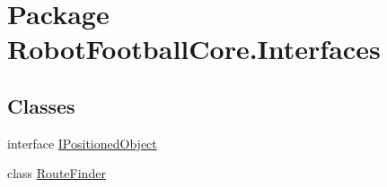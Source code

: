 \hypertarget{namespace_robot_football_core_1_1_interfaces}{\section{Package Robot\-Football\-Core.\-Interfaces}
\label{namespace_robot_football_core_1_1_interfaces}
}
\subsection*{Classes}
\begin{DoxyCompactItemize}
\item 
interface \hyperlink{interface_robot_football_core_1_1_interfaces_1_1_i_positioned_object}{I\-Positioned\-Object}
\item 
class \hyperlink{class_robot_football_core_1_1_interfaces_1_1_route_finder}{Route\-Finder}
\end{DoxyCompactItemize}
